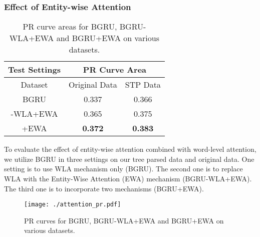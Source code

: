\documentclass[11pt,a4paper]{article}
\begin{document}
  \subsubsection*{Effect of Entity-wise Attention}

  \begin{table}[htbp]
    \centering
    \begin{tabular}{|c|c|c|}
      \hline
      Test Settings & \multicolumn{2}{|c|}{PR Curve Area} \\
      \hline
      Dataset & Original Data & STP Data \\
      \hline
      BGRU & 0.337 & 0.366 \\
      \hline
      -WLA+EWA & 0.365 & 0.375 \\
      \hline
      +EWA & \textbf{0.372} & \textbf{0.383} \\
      \hline
    \end{tabular}
    \caption{PR curve areas for BGRU, BGRU-WLA+EWA and BGRU+EWA on various datasets.}
    \label{table:attention}
  \end{table}

  To evaluate the effect of entity-wise attention combined with word-level attention, we utilize BGRU in three settings on our tree parsed data and original data. One setting is to use WLA mechanism only (BGRU). The second one is to replace WLA with the Entity-Wise Attention (EWA) mechanism (BGRU-WLA+EWA). The third one is to incorporate two mechanisms (BGRU+EWA).

  \begin{figure}[htbp]
    \centering
    \texttt{[image: ./attention\_pr.pdf]}
    \caption{PR curves for BGRU, BGRU-WLA+EWA and BGRU+EWA on various datasets.}
    \label{fig:attention}
  \end{figure}
\end{document}

